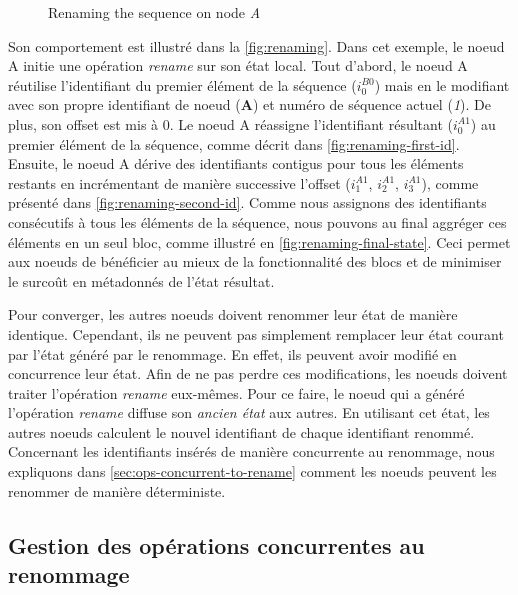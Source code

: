 \documentclass[12pt]{thesul}
\newcommand{\trm}[1]{\mathit{#1}}
\newcommand{\id}[3]{$\trm{#1}^{\trm{#2}}_{\trm{#3}}$}
\begin{document}
\begin{figure}[t!]
{\begin{minipage}{\linewidth}
          \label{fig:renaming-final-state}
      \end{minipage}}
  \caption{Renaming the sequence on node \emph{A}}
  \label{fig:renaming}
\end{figure}

Son comportement est illustré dans la \autoref{fig:renaming}.
Dans cet exemple, le noeud A initie une opération \emph{rename} sur son état local.
Tout d'abord, le noeud A réutilise l'identifiant du premier élément de la séquence (\id{i}{B0}{0}) mais en le modifiant avec son propre identifiant de noeud (\textbf{A}) et numéro de séquence actuel (\emph{1}).
De plus, son offset est mis à 0.
Le noeud A réassigne l'identifiant résultant (\id{i}{A1}{0}) au premier élément de la séquence, comme décrit dans \autoref{fig:renaming-first-id}.
Ensuite, le noeud A dérive des identifiants contigus pour tous les éléments restants en incrémentant de manière successive l'offset (\id{i}{A1}{1}, \id{i}{A1}{2}, \id{i}{A1}{3}), comme présenté dans \autoref{fig:renaming-second-id}.
Comme nous assignons des identifiants consécutifs à tous les éléments de la séquence, nous pouvons au final aggréger ces éléments en un seul bloc, comme illustré en \autoref{fig:renaming-final-state}.
Ceci permet aux noeuds de bénéficier au mieux de la fonctionnalité des blocs et de minimiser le surcoût en métadonnés de l'état résultat.

Pour converger, les autres noeuds doivent renommer leur état de manière identique.
Cependant, ils ne peuvent pas simplement remplacer leur état courant par l'état généré par le renommage.
En effet, ils peuvent avoir modifié en concurrence leur état.
Afin de ne pas perdre ces modifications, les noeuds doivent traiter l'opération \emph{rename} eux-mêmes.
Pour ce faire, le noeud qui a généré l'opération \emph{rename} diffuse son \emph{ancien état} aux autres.
En utilisant cet état, les autres noeuds calculent le nouvel identifiant de chaque identifiant renommé.
Concernant les identifiants insérés de manière concurrente au renommage, nous expliquons dans \autoref{sec:ops-concurrent-to-rename} comment les noeuds peuvent les renommer de manière déterministe.

\subsection{Gestion des opérations concurrentes au renommage}
\end{document}
